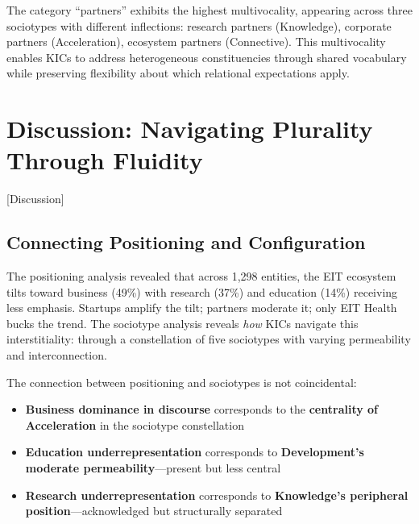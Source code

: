 \documentclass[../main.tex]{subfiles}
\begin{document}
The category ``partners'' exhibits the highest multivocality, appearing across three sociotypes with different inflections: research partners (Knowledge), corporate partners (Acceleration), ecosystem partners (Connective). This multivocality enables KICs to address heterogeneous constituencies through shared vocabulary while preserving flexibility about which relational expectations apply.


\section{Discussion: Navigating Plurality Through Fluidity}[Discussion]

\subsection{Connecting Positioning and Configuration}

The positioning analysis revealed that across 1,298 entities, the EIT ecosystem tilts toward business (49\%) with research (37\%) and education (14\%) receiving less emphasis. Startups amplify the tilt; partners moderate it; only EIT Health bucks the trend. The sociotype analysis reveals \textit{how} KICs navigate this interstitiality: through a constellation of five sociotypes with varying permeability and interconnection.

The connection between positioning and sociotypes is not coincidental:

\begin{itemize}
    \item \textbf{Business dominance in discourse} corresponds to the \textbf{centrality of Acceleration} in the sociotype constellation
    \item \textbf{Education underrepresentation} corresponds to \textbf{Development's moderate permeability}---present but less central
    \item \textbf{Research underrepresentation} corresponds to \textbf{Knowledge's peripheral position}---acknowledged but structurally separated
\end{itemize}
\end{document}
